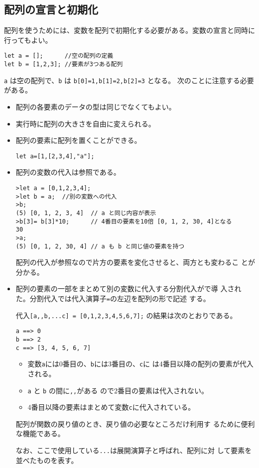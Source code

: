 \subsection{配列の宣言と初期化}
配列を使うためには、変数を配列で初期化する必要がある。変数の宣言と同時に
行ってもよい。
\begin{Verbatim}
let a = [];      //空の配列の定義
let b = [1,2,3]; //要素が3つある配列
\end{Verbatim}
\Verb+a+ は空の配列で、\Verb+b+ は
\Verb+b[0]=1,b[1]=2,b[2]=3+ となる。
次のことに注意する必要がある。
\begin{itemize}
 \item 配列の各要素のデータの型は同じでなくてもよい。
 \item 実行時に配列の大きさを自由に変えられる。
 \item 配列の要素に配列を置くことができる。
\begin{Verbatim}
let a=[1,[2,3,4],"a"];
\end{Verbatim}
 \item 配列の変数の代入は参照である。
\begin{Verbatim}
>let a = [0,1,2,3,4];
>let b = a;  //別の変数への代入
>b;
(5) [0, 1, 2, 3, 4]  // a と同じ内容が表示
>b[3]= b[3]*10;      // 4番目の要素を10倍 [0, 1, 2, 30, 4]となる
30
>a;
(5) [0, 1, 2, 30, 4] // a も b と同じ値の要素を持つ
\end{Verbatim}
       配列の代入が参照なので片方の要素を変化させると、両方とも変わるこ
       とが分かる。
 \item 配列の要素の一部をまとめて別の変数に代入する分割代入が\ES で導
       入された。分割代入では代入演算子\texttt{=}の左辺を配列の形で記述
       する。

       代入\Verb+[a,,b,...c] = [0,1,2,3,4,5,6,7];+
の結果は次のとおりである。
\begin{Verbatim}
a ==> 0
b ==> 2
c ==> [3, 4, 5, 6, 7]
\end{Verbatim}
       \begin{itemize}
        \item  変数\Verb+a+には0番目の、\Verb+b+には3番目の、\Verb+c+に
               は4番目以降の配列の要素が代入される。
        \item \Verb+a+ と \Verb+b+ の間に\Verb+,,+がある
       ので2番目の要素は代入されない。
        \item 4番目以降の要素はまとめて変数\Verb+c+に代入されている。

       \end{itemize}

 配列が関数の戻り値のとき、戻り値の必要なところだけ利用す
       るために便利な機能である。

       なお、ここで使用している\Verb+...+は展開演算子と呼ばれ、配列に対
       して要素を並べたものを表す。
\end{itemize}

